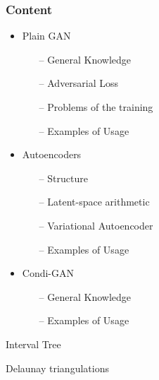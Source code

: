 \begin{frame}
	\frametitle{Content}
	\begin{itemize}
		\item Plain GAN
			\begin{itemize}
				\item[--] General Knowledge
				\item[--] Adversarial Loss
				\item[--] Problems of the training
				\item[--] Examples of Usage 
			\end{itemize}
		\item Autoencoders
			\begin{itemize}
				\item[--] Structure
				\item[--] Latent-space arithmetic
				\item[--] Variational Autoencoder
				\item[--] Examples of Usage 
			\end{itemize}
		\item Condi-GAN
			\begin{itemize}
				\item[--] General Knowledge
				\item[--] Examples of Usage 
			\end{itemize}
		
	\end{itemize}
\end{frame}

\endgroup

\begin{frame}{Interval Tree}

    
\end{frame}

\begin{frame}{Delaunay triangulations}

\cite{DeBerg2008}
    
\end{frame}
